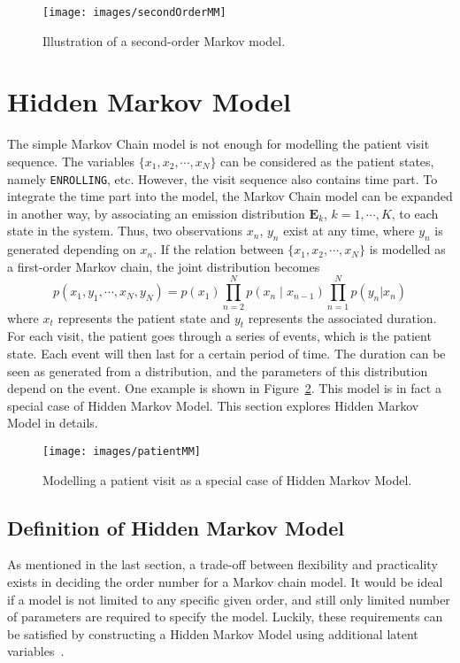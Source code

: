 \begin{figure}[!ht]
	\begin{center}
		\texttt{[image: images/secondOrderMM]}
		\caption{Illustration of a second-order Markov model.}
		\label{fig:secondOrderMM}
	\end{center}
\end{figure}


\section{Hidden Markov Model}
\label{sec:HMM}
The simple Markov Chain model is not enough for modelling the patient visit sequence. The variables \(\{x_1, x_2, \cdots, x_N\}\) can be considered as the patient states, namely \texttt{ENROLLING}, etc. However, the visit sequence also contains time part. To integrate the time part into the model, the Markov Chain model can be expanded in another way, by associating an emission distribution \(\mathbf{E}_k\), \(k = 1, \cdots , K\), to each state in the system. Thus, two observations \(x_n\), \(y_n\) exist at any time, where \(y_n\) is generated depending on \(x_n\). If the relation between \(\{x_1, x_2, \cdots, x_N\}\) is modelled as a first-order Markov chain, the joint distribution becomes
\begin{equation}
	p(x_1, y_1, \cdots, x_N, y_N) = p(x_1) \prod_{n = 2}^{N} p(x_n \mid x_{n-1}) \prod_{n = 1}^{N}p(y_n|x_n)
\end{equation}
where \(x_t\) represents the patient state and \(y_t\) represents the associated duration. For each visit, the patient goes through a series of events, which is the patient state. Each event will then last for a certain period of time. The duration can be seen as generated from a distribution, and the parameters of this distribution depend on the event. One example is shown in Figure~\ref{fig:patientMM}. This model is in fact a special case of Hidden Markov Model. This section explores Hidden Markov Model in details.

\begin{figure}[!ht]
	\begin{center}
		\texttt{[image: images/patientMM]}
		\caption{Modelling a patient visit as a special case of Hidden Markov Model.}
		\label{fig:patientMM}
	\end{center}
\end{figure}

\subsection{Definition of Hidden Markov Model}
As mentioned in the last section, a trade-off between flexibility and practicality exists in deciding the order number for a Markov chain model. It would be ideal if a model is not limited to any specific given order, and still only limited number of parameters are required to specify the model. Luckily, these requirements can be satisfied by constructing a Hidden Markov Model using additional latent variables~\cite{PRML}. 

